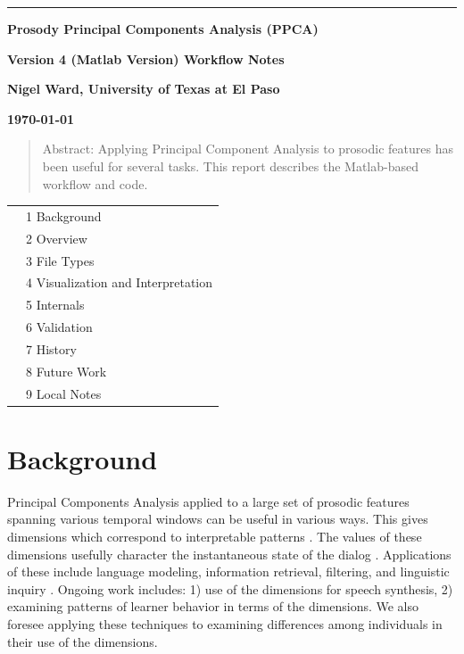 \documentclass[11pt]{article}
\begin{document}
\noindent
\thispagestyle{empty}
\sloppy

\rule{1mm}{0mm}

\vspace{-17mm}
{\LARGE \bf Prosody Principal Components Analysis (PPCA) }
\medskip


{\LARGE \bf Version 4 (Matlab Version) Workflow Notes}
\vspace{7mm}


{\bf Nigel Ward, University of Texas at El Paso}

{\bf \today }

\medskip
\begin{quote}
Abstract: Applying Principal Component Analysis to prosodic features
has been useful for several tasks.  This report describes the
Matlab-based workflow and code.
\end{quote}

\begin{tabular}{p{5cm}l}
& 1 Background  \\
& 2 Overview \\
& 3 File Types \\
& 4 Visualization and Interpretation \\
& 5 Internals\\ 
& 6 Validation \\
& 7 History \\
& 8 Future Work \\
& 9 Local Notes
\end{tabular}


\section{Background} 

Principal Components Analysis applied to a large set of prosodic
features spanning various temporal windows can be useful in various
ways.  This gives dimensions which correspond to interpretable
patterns \cite{prosodic-elements}.  The values of these dimensions
usefully character the instantaneous state of the dialog
\cite{dialog-dimensions}.  Applications of these include language
modeling, information retrieval, filtering, and linguistic inquiry
\cite{pca-lm,prosody-ir,sigdial-codec,dimensions-uh-huh}.  Ongoing
work includes: 1) use of the dimensions for speech synthesis, 2)
examining patterns of learner behavior in terms of the dimensions.  We
also foresee applying these techniques to examining differences among
individuals in their use of the dimensions.
\end{document}
